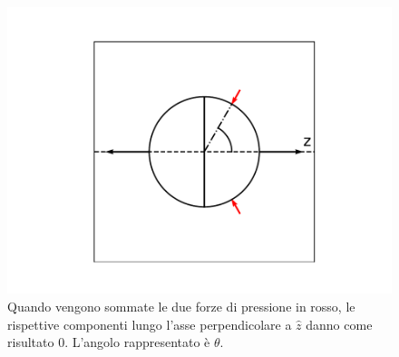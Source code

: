 \documentclass[12pt,a4paper]{book}
\begin{document}
 \begin{figure}[!ht]
 \centering
\includegraphics[scale=0.55]{magde3.pdf}
\caption{Quando vengono sommate le due forze di pressione in rosso, le rispettive componenti lungo l'asse perpendicolare a $\hat{z}$ danno come risultato $0$. L'angolo rappresentato è $\theta$. \label{fig:magde3} }
\end{figure}
\end{document}
